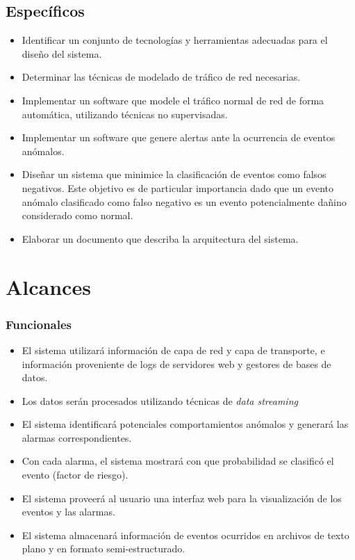 \subsection*{Específicos}
\begin{itemize}

\item Identificar un conjunto de tecnologías y herramientas adecuadas para el diseño del sistema.
\item Determinar las técnicas de modelado de tráfico de red necesarias.
\item Implementar un software que modele el tráfico normal de red de forma automática, utilizando técnicas no supervisadas.
\item Implementar un software que genere alertas ante la ocurrencia de eventos anómalos.
\item Diseñar un sistema que minimice la clasificación de eventos como falsos negativos. Este objetivo es de particular importancia dado que un evento anómalo clasificado como falso negativo es un evento potencialmente dañino considerado como normal.
\item Elaborar un documento que describa la arquitectura del sistema.
\end{itemize}

\section*{Alcances}

\subsubsection*{Funcionales}
\begin{itemize}
	\item El sistema utilizará información de capa de red\cite{rfc791} y capa de transporte\cite{rfc793}\cite{rfc1180}, e información proveniente de logs de servidores web y gestores de bases de datos.
	\item Los datos serán procesados utilizando técnicas de \textit{data streaming}\cite{Fischer:2012:RVA:2245276.2245432}
	\item El sistema identificará potenciales comportamientos anómalos y generará las alarmas correspondientes.
	\item Con cada alarma, el sistema mostrará con que probabilidad se clasificó el evento (factor de riesgo).
	\item El sistema proveerá al usuario una interfaz web para la visualización de los eventos y las alarmas.
	\item El sistema almacenará información de eventos ocurridos en archivos de texto plano y en formato semi-estructurado.
\end{itemize}

